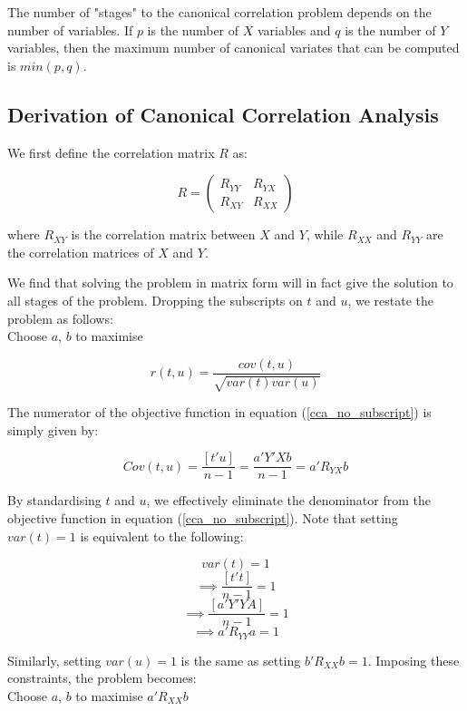 The number of "stages" to the canonical correlation problem depends on the number of variables. 
If $p$ is the number of $X$ variables and $q$ is the number of $Y$ variables, then the maximum 
number of canonical variates that can be computed is $min(p,q)$.

\subsection{Derivation of Canonical Correlation Analysis}

We first define the correlation matrix $R$ as:


$$R = 
\begin{pmatrix}
R_{YY} & R_{YX} \\
R_{XY} & R_{XX} 
\end{pmatrix}
$$

where $R_{XY}$ is the correlation matrix between $X$ and $Y$, while $R_{XX}$ and $R_{YY}$ are the correlation matrices of $X$ and $Y$.  


We find that solving the problem in  matrix form will in fact give the solution to all 
stages of the problem. Dropping the subscripts on $t$ and $u$, we restate the problem as follows:\\

Choose $a$, $b$ to maximise 

\begin{equation}
\label{cca_no_subscript}
r(t, u)=\frac{cov(t,u)}{\sqrt{var(t)var(u)}}
\end{equation}

The numerator of the objective function in equation (\ref{cca_no_subscript}) is simply given by:

$$Cov(t,u) = \frac{[t'u]}{n-1}=\frac{a'Y'Xb}{n-1} = a'R_{YX}b$$

By standardising $t$ and $u$, we effectively eliminate the denominator from the objective 
function in equation (\ref{cca_no_subscript}). Note that setting $ var(t) = 1 $ is equivalent to the following:
  
$$ var(t) = 1 $$
$$\implies \frac{[t't]}{n-1} = 1 $$
$$ \implies \frac{[a'Y'YA]}{n-1} = 1 $$
$$ \implies a'R_{YY}a = 1$$

Similarly, setting $var(u) = 1$ is the same as setting $b'R_{XX}b = 1$. Imposing these 
constraints, the problem becomes:\\

Choose $a$, $b$ to maximise $a'R_{XX}b$

